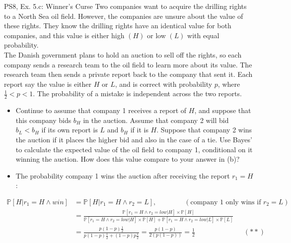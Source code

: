 \begin{frame}{PS8, Ex. 5.c: Winner's Curse}
      Two companies want to acquire the drilling rights to a North Sea oil field. However, the companies are unsure about the value of these rights. They know the drilling rights have an identical value for both companies, and this value is either high $(H)$ or low $(L)$ with equal probability.\\\smallskip
      The Danish government plans to hold an auction to sell off the rights, so each company sends a research team to the oil field to learn more about its value. The research team then sends a private report back to the company that sent it. Each report say the value is either $H$ or $L$, and is correct with probability $p$, where $\frac{1}{2} < p < 1$. The probability of a mistake is independent across the two reports.
      \vspace{-2pt}
      \begin{itemize}
        \item[(c)] Continue to assume that company 1 receives a report of $H$, and suppose that this company bids $b_H$ in the auction. Assume that company 2 will bid $b_L < b_H$ if its own report is $L$ and $b_H$ if it is $H$. Suppose that company 2 wins the auction if it places the higher bid and also in the case of a tie. Use Bayes’ to calculate the expected value of the oil field to company 1, conditional on it winning the auction. How does this value compare to your answer in (b)?
        \item[Step 1:] The probability company 1 wins the auction after receiving the report $r_1=H$:
        \end{itemize}
        \vspace{-8pt}
        \begin{align*}
          \mathbb{P}[H|r_1=H\wedge win]&=\mathbb{P}[H|r_1=H\wedge r_2=L],\quad\quad\quad\quad(\text{company 1 only wins if }r_2=L)\\
            &=\frac{\mathbb{P}[r_1=H\wedge r_2=low|H]\times\mathbb{P}[H]}{\mathbb{P}[r_1=H\wedge r_2=low|H]\times\mathbb{P}[H]+\mathbb{P}[r_1=H\wedge r_2=low|L]\times\mathbb{P}[L]}&\\
            &=\frac{p(1-p)\frac{1}{2}}{p(1-p)\frac{1}{2}+(1-p)p\frac{1}{2}}=\frac{p(1-p)}{2(p(1-p))}=\frac{1}{2}\quad\quad\quad\quad\quad\quad\quad(**)
        \end{align*}
      \vfill\null
\end{frame}

